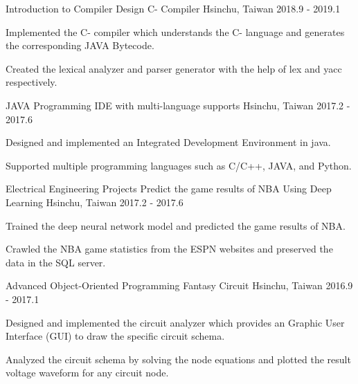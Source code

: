

\begin{cventries}

  \cventry
    {Introduction to Compiler Design} %
    {C- Compiler} %
    {Hsinchu, Taiwan} %
    {2018.9 - 2019.1} %
    {
      \begin{cvitems} %
        \item {Implemented the C- compiler which understands the C- language and generates the corresponding JAVA Bytecode.}
        \item {Created the lexical analyzer and parser generator with the help of lex and yacc respectively.}
      \end{cvitems}
    }
    
  \cventry
    {JAVA Programming} %
    {IDE with multi-language supports} %
    {Hsinchu, Taiwan} %
    {2017.2 - 2017.6} %
    {
      \begin{cvitems} %
        \item {Designed and implemented an Integrated Development Environment in java.}
        \item {Supported multiple programming languages such as C/C++, JAVA, and Python.}
      \end{cvitems}
    }
    
  \cventry
    {Electrical Engineering Projects} %
    {Predict the game results of NBA Using Deep Learning} %
    {Hsinchu, Taiwan} %
    {2017.2 - 2017.6} %
    {
      \begin{cvitems} %
        \item {Trained the deep neural network model and predicted the game results of NBA. }
        \item {Crawled the NBA game statistics from the ESPN websites and preserved the data in the SQL server.}
      \end{cvitems}
    }
    
  \cventry
    {Advanced Object-Oriented Programming} %
    {Fantasy Circuit} %
    {Hsinchu, Taiwan} %
    {2016.9 - 2017.1} %
    {
      \begin{cvitems} %
        \item {Designed and implemented the circuit analyzer which provides an Graphic User Interface (GUI) to draw the specific circuit schema.}
        \item Analyzed the circuit schema by solving the node equations and plotted the result voltage waveform for any circuit node. 
      \end{cvitems}
    }

\end{cventries}

